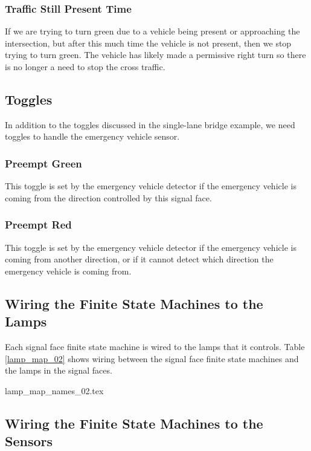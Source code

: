 \documentclass[letterpaper,twoside]{article}
\begin{document}
\subsubsection{Traffic Still Present Time}
If we are trying to turn green due to a vehicle being present or approaching
the intersection, but after this much time the vehicle is not present, then
we stop trying to turn green.  The vehicle has likely made a permissive right
turn so there is no longer a need to stop the cross traffic.

\subsection{Toggles}

In addition to the toggles discussed in the single-lane bridge example,
we need toggles to handle the emergency vehicle sensor.

\subsubsection{Preempt Green}

This toggle is set by the emergency vehicle detector if the emergency
vehicle is coming from the direction controlled by this signal face.

\subsubsection{Preempt Red}

This toggle is set by the emergency vehicle detector if the emergency
vehicle is coming from another direction, or if it cannot detect
which direction the emergency vehicle is coming from.

\subsection{Wiring the Finite State Machines to the Lamps}

Each signal face finite state machine is wired to the lamps that
it controls.  Table \ref{lamp_map_02} shows wiring between the signal
face finite state machines and the lamps in the signal faces.

 {lamp_map_names_02.tex}

\subsection{Wiring the Finite State Machines to the Sensors}
\end{document}

